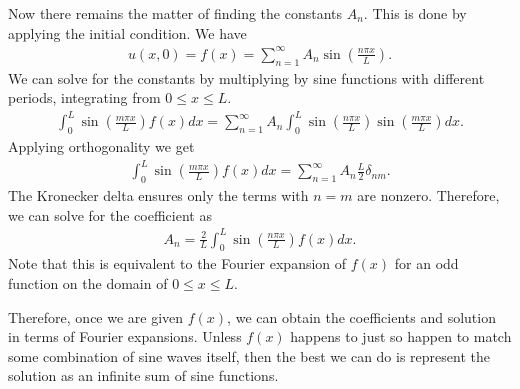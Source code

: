 Now there remains the matter of finding the constants $A_n$. This is done by applying the initial condition. We have
\begin{align}
  u(x,0) = f(x) = \sum_{n=1}^\infty A_n \sin \left( \frac{ n \pi x }{ L } \right) .
\end{align}
We can solve for the constants by multiplying by sine functions with different periods, integrating from $0 \le x \le L$.
\begin{align}
  \int_0^L \sin \left( \frac{ m \pi x }{ L } \right) f(x) dx = \sum_{n=1}^\infty A_n \int_0^L \sin \left( \frac{ n \pi x }{ L } \right)  \sin \left( \frac{ m \pi x }{ L } \right) dx .
\end{align}
Applying orthogonality we get
\begin{align}
  \int_0^L \sin \left( \frac{ m \pi x }{ L } \right) f(x) dx = \sum_{n=1}^\infty A_n \frac{L}{2} \delta_{nm}.
\end{align}
The Kronecker delta ensures only the terms with $n = m$ are nonzero. Therefore, we can solve for the coefficient as
\begin{align}
  A_n = \frac{2}{L} \int_0^L \sin \left( \frac{ n \pi x }{ L } \right) f(x) dx .
\end{align}
Note that this is equivalent to the Fourier expansion of $f(x)$ for an odd function on the domain of $0 \le x \le L$.

Therefore, once we are given $f(x)$, we can obtain the coefficients and solution in terms of Fourier expansions. Unless $f(x)$ happens to just so happen to match some combination of sine waves itself, then the best we can do is represent the solution as an infinite sum of sine functions.

